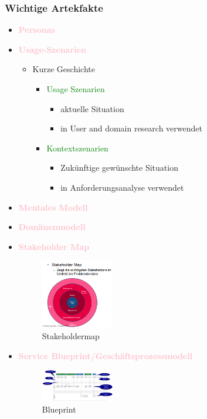 \documentclass{article}
\begin{document}
\subsubsection{Wichtige Artekfakte}
\begin{itemize}
	\item \textcolor{pink}{\textbf{Personas}}
	\item \textcolor{pink}{\textbf{Usage-Szenarien}}
	\begin{itemize}
		\item Kurze Geschichte
		\begin{itemize}
			\item \textcolor{green} {Usage Szenarien}
			\begin{itemize}
				\item aktuelle Situation
				\item in User and domain research verwendet
			\end{itemize}
			\item \textcolor{green} {Kontextszenarien}
			\begin{itemize}
				\item Zukünftige gewünschte Situation
				\item in Anforderungsanalyse verwendet
			\end{itemize}
		\end{itemize}
		
	\end{itemize}
	\item \textcolor{pink}{\textbf{Mentales Modell}}
	\item \textcolor{pink}{\textbf{Domänenmodell}}
	\item \textcolor{pink}{\textbf{Stakeholder Map}}
	\begin{figure}[H]
	\centering
	\includegraphics[width=0.3\textwidth]{Resources/Images/Stakeholdermap.png}
	\caption{\label{fig:Stakeholdermap} Stakeholdermap}
	\end{figure}
	\item \textcolor{pink}{\textbf{Service Blueprint/Geschäftsprozessmodell}}
	\begin{figure}[H]
	\centering
	\includegraphics[width=0.3\textwidth] {Resources/Images/Blueprint.png}
	\caption{\label{fig:Blueprint}Blueprint}
	\end{figure}
	
\end{itemize}
\end{document}

